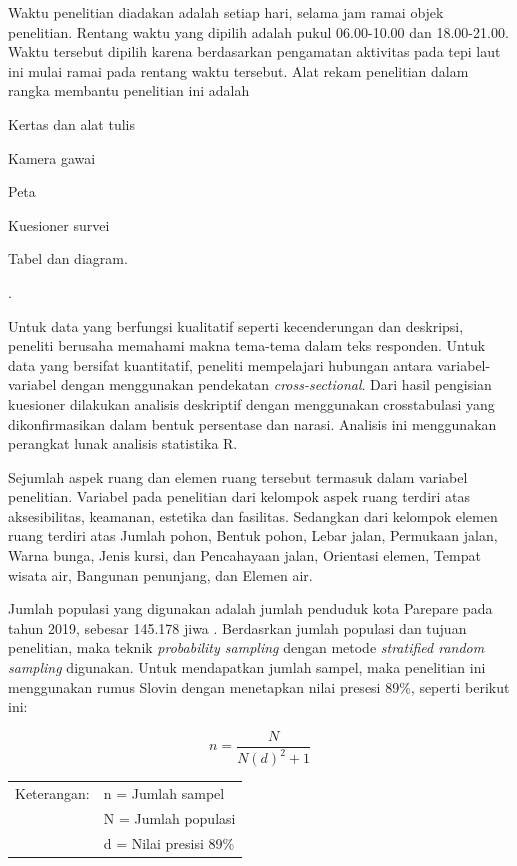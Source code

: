 \documentclass[11pt]{simart} %
\begin{document}
Waktu penelitian diadakan adalah setiap hari, selama jam ramai objek penelitian.
Rentang waktu yang dipilih adalah pukul 06.00-10.00 dan 18.00-21.00. Waktu tersebut dipilih karena berdasarkan pengamatan aktivitas pada tepi laut ini mulai ramai pada rentang waktu tersebut. Alat rekam penelitian dalam rangka membantu penelitian ini adalah \begin{inparaenum} \item Kertas dan alat tulis \item Kamera gawai \item Peta \item Kuesioner survei  \item Tabel dan diagram.  \end{inparaenum}.

Untuk data yang berfungsi kualitatif seperti kecenderungan dan deskripsi, peneliti berusaha memahami makna tema-tema dalam teks responden.
Untuk data yang bersifat kuantitatif, peneliti mempelajari hubungan antara variabel-variabel dengan menggunakan pendekatan \textit{cross-sectional}. Dari hasil pengisian kuesioner dilakukan analisis deskriptif dengan menggunakan crosstabulasi yang dikonfirmasikan dalam bentuk persentase dan narasi.
Analisis ini menggunakan perangkat lunak analisis statistika R.

Sejumlah aspek ruang dan elemen ruang tersebut termasuk dalam variabel penelitian. Variabel pada penelitian dari kelompok aspek ruang terdiri atas aksesibilitas, keamanan, estetika dan fasilitas. Sedangkan dari kelompok elemen ruang terdiri atas Jumlah pohon, Bentuk pohon, Lebar jalan, Permukaan jalan, Warna bunga, Jenis kursi, dan Pencahayaan jalan, Orientasi elemen, Tempat wisata air, Bangunan penunjang, dan Elemen air.

Jumlah populasi yang digunakan adalah jumlah penduduk kota Parepare pada tahun 2019, sebesar 145.178 jiwa \citep{bpskotaparepare2020}. Berdasrkan jumlah populasi dan tujuan penelitian, maka teknik \textit{probability sampling} dengan metode \textit{stratified random sampling} digunakan.
Untuk mendapatkan jumlah sampel, maka penelitian ini menggunakan rumus Slovin dengan menetapkan nilai presesi 89\%, seperti berikut ini:

$$ n= \frac{N}{N(d)^2+1} $$

\begin{tabular}{ll}
   \small
   Keterangan:  & n = Jumlah sampel \\
                & N = Jumlah populasi\\
                & d = Nilai presisi 89\%\\

\end{tabular}
\end{document}
